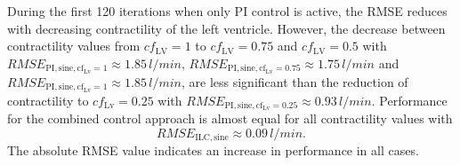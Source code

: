 During the first 120 iterations when only PI control is active, the RMSE reduces with decreasing contractility of the left ventricle.
\newpage
However, the decrease between contractility values from $cf_{\mathrm{LV}}=1$ to $cf_{\mathrm{LV}}=0.75$ and $cf_{\mathrm{LV}}=0.5$ with $RMSE_{\mathrm{PI,sine,cf_{\mathrm{Lv}}=1}}\approx 1.85\, l/min$, $RMSE_{\mathrm{PI,sine,cf_{\mathrm{Lv}}=0.75}}\approx 1.75\, l/min$ and $RMSE_{\mathrm{PI,sine,cf_{\mathrm{Lv}}=1}}\approx 1.85\, l/min$, are less significant than the reduction of contractility to $cf_{\mathrm{Lv}}=0.25$ with $RMSE_{\mathrm{PI,sine,cf_{\mathrm{Lv}}=0.25}}\approx 0.93\, l/min$.
Performance for the combined control approach is almost equal for all contractility values with
\begin{equation}
  RMSE_{\mathrm{ILC,sine}}\approx 0.09\, l/min.
\end{equation}
The absolute RMSE value indicates an increase in performance in all cases.


